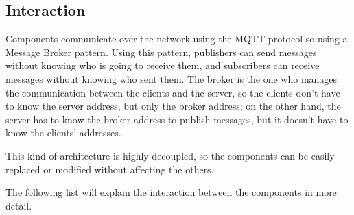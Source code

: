 \documentclass{scrartcl}
\begin{document}
\subsection{Interaction}\label{interaction}
Components communicate over the network using the MQTT protocol so using a Message Broker pattern.
Using this pattern, publishers can send messages without knowing who is going to receive them, and
subscribers can receive messages without knowing who sent them.
The broker is the one who manages the communication between the clients and the server, so the clients
don't have to know the server address, but only the broker address; on the other hand, the server has
to know the broker address to publish messages, but it doesn't have to know the clients' addresses.

This kind of architecture is highly decoupled, so the components can be easily replaced or modified
without affecting the others.

The following list will explain the interaction between the components in more detail.
\end{document}

